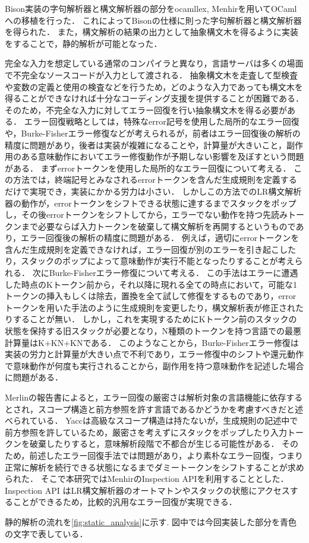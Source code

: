 \documentclass[fontsize=9bp,twocolumn,column_gap=2.36zw,a4paper,report]{jlreq}
\begin{document}
Bison実装の字句解析器と構文解析器の部分をocamllex, Menhirを用いてOCamlへの移植を行った．
これによってBisonの仕様に則った字句解析器と構文解析器を得られた．
また，構文解析の結果の出力として抽象構文木を得るように実装をすることで，静的解析が可能となった．\par
完全な入力を想定している通常のコンパイラと異なり，言語サーバは多くの場面で不完全なソースコードが入力として渡される．
抽象構文木を走査して型検査や変数の定義と使用の検査などを行うため，どのような入力であっても構文木を得ることができなければ十分なコーディング支援を提供することが困難である．
そのため，不完全な入力に対してエラー回復を行い抽象構文木を得る必要がある．
エラー回復戦略としては，特殊なerror記号を使用した局所的なエラー回復や，Burke-Fisherエラー修復などが考えられるが，前者はエラー回復後の解析の精度に問題があり，後者は実装が複雑になることや，計算量が大きいこと，副作用のある意味動作においてエラー修復動作が予期しない影響を及ぼすという問題がある．
まずerrorトークンを使用した局所的なエラー回復について考える．
この方法では，終端記号とみなされるerrorトークンを含んだ生成規則を定義するだけで実現でき，実装にかかる労力は小さい．
しかしこの方法でのLR構文解析器の動作が，errorトークンをシフトできる状態に達するまでスタックをポップし，その後errorトークンをシフトしてから，エラーでない動作を持つ先読みトークンまで必要ならば入力トークンを破棄して構文解析を再開するというものであり，エラー回復後の解析の精度に問題がある．
例えば，適切にerrorトークンを含んだ生成規則を定義できなければ，エラー回復が別のエラーを引き起こしたり，スタックのポップによって意味動作が実行不能となったりすることが考えられる．
次にBurke-Fisherエラー修復について考える．
この手法はエラーに遭遇した時点のKトークン前から，それ以降に現れる全ての時点において，可能な1トークンの挿入もしくは除去，置換を全て試して修復をするものであり，errorトークンを用いた手法のように生成規則を変更したり，構文解析表が修正されたりすることが無い．
しかし，これを実現するためにKトークン前のスタックの状態を保持する旧スタックが必要となり，N種類のトークンを持つ言語での最悪計算量はK+K\cdot N+K\cdot Nである．
このようなことから，Burke-Fisherエラー修復は実装の労力と計算量が大きい点で不利であり，エラー修復中のシフトや還元動作で意味動作が何度も実行されることから，副作用を持つ意味動作を記述した場合に問題がある．\par
Merlinの報告書\cite{merlin}によると，エラー回復の厳密さは解析対象の言語機能に依存するとされ，スコープ構造と前方参照を許す言語であるかどうかを考慮すべきだと述べられている．
Yaccは高級なスコープ構造は持たないが，生成規則の記述中で前方参照を許しているため，厳密さを考えずにスタックをポップしたり入力トークンを破棄したりすると，意味解析段階で不都合が生じる可能性がある．
そのため，前述したエラー回復手法では問題があり，より素朴なエラー回復，つまり正常に解析を続行できる状態になるまでダミートークンをシフトすることが求められた．
そこで本研究ではMenhirのInspection APIを利用することとした．
Inspection API はLR構文解析器のオートマトンやスタックの状態にアクセスすることができるため，比較的汎用なエラー回復が実現できる．\par
静的解析の流れを\ref{fig:static_analysis}に示す.
図中では今回実装した部分を青色の文字で表している．
\end{document}

